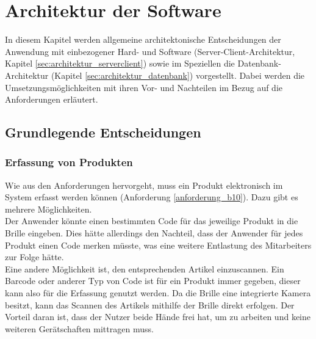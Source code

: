 \chapter{Architektur der Software}
\label{cha:architektur}
\sloppy

In diesem Kapitel werden allgemeine architektonische Entscheidungen der Anwendung mit einbezogener Hard- und Software (Server-Client-Architektur, Kapitel \ref{sec:architektur_serverclient}) sowie im Speziellen die Datenbank-Architektur (Kapitel \ref{sec:architektur_datenbank}) vorgestellt. Dabei werden die Umsetzungsmöglichkeiten mit ihren Vor- und Nachteilen im Bezug auf die Anforderungen erläutert.

\section{Grundlegende Entscheidungen}
\label{sec:grund_entscheidungen}

\subsection{Erfassung von Produkten}
Wie aus den Anforderungen hervorgeht, muss ein Produkt elektronisch im System erfasst werden können (Anforderung \ref{anforderung_b10}). Dazu gibt es mehrere Möglichkeiten.\\ 
Der Anwender könnte einen bestimmten Code für das jeweilige Produkt in die Brille eingeben. Dies hätte allerdings den Nachteil, dass der Anwender für jedes Produkt einen Code merken müsste, was eine weitere Entlastung des Mitarbeiters zur Folge hätte.\\
Eine andere Möglichkeit ist, den entsprechenden Artikel einzuscannen. Ein Barcode oder anderer Typ von Code ist für ein Produkt immer gegeben, dieser kann also für die Erfassung genutzt werden. Da die Brille eine integrierte Kamera besitzt, kann das Scannen des Artikels mithilfe der Brille direkt erfolgen. Der Vorteil daran ist, dass der Nutzer beide Hände frei hat, um zu arbeiten und keine weiteren Gerätschaften mittragen muss.

